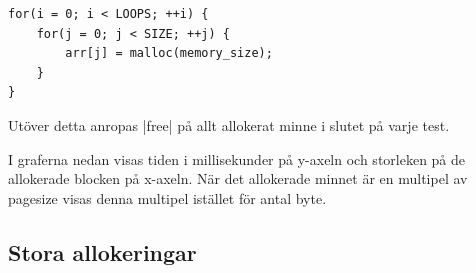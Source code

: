 \documentclass[paper=a4, fontsize=11pt]{scrartcl} %
\numberwithin{equation}{section} %
\numberwithin{figure}{section} %
\numberwithin{table}{section} %
\begin{document}
\begin{verbatim}
for(i = 0; i < LOOPS; ++i) {
    for(j = 0; j < SIZE; ++j) {
        arr[j] = malloc(memory_size);
    }
}
\end{verbatim}

Utöver detta anropas |free| på allt allokerat minne i slutet på varje test.

I graferna nedan visas tiden i millisekunder på y-axeln och storleken på 
de allokerade blocken på x-axeln. När det allokerade minnet är en multipel
av pagesize visas denna multipel istället för antal byte.

\captionsetup{labelsep=newline}

\subsection{Stora allokeringar}
\end{document}

